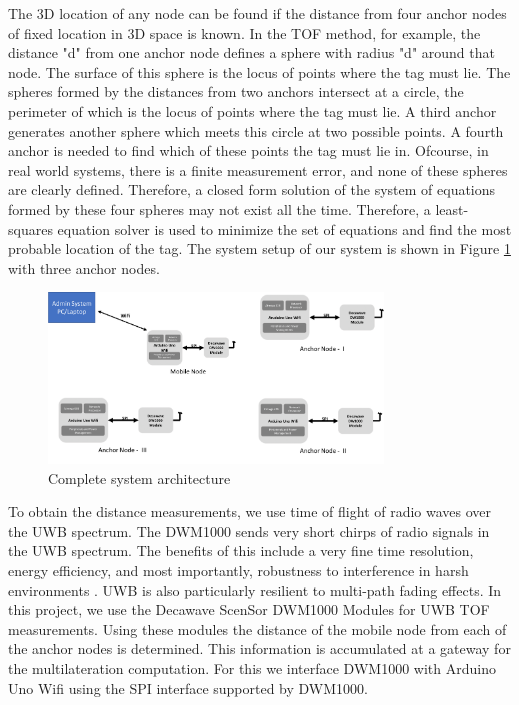 \documentclass[journal,transmag]{IEEEtran}
\begin{document}
The 3D location of any node can be found if the distance from four anchor nodes of fixed location in 3D space is known.  In the TOF method, for example, the distance "d" from one anchor node defines a sphere with radius "d" around that node.  The surface of this sphere is the locus of points where the tag must lie.  The spheres formed by the distances from two anchors intersect at a circle, the perimeter of which is the locus of points where the tag must lie.  A third anchor generates another sphere which meets this circle at two possible points.  A fourth anchor is needed to find which of these points the tag must lie in.  Ofcourse, in real world systems, there is a finite measurement error, and none of these spheres are clearly defined.  Therefore, a closed form solution of the system of equations formed by these four spheres may not exist all the time.  Therefore, a least-squares equation solver is used to minimize the set of equations and find the most probable location of the tag. The system setup of our system is shown in Figure \ref{SYSTEMBD} with three anchor nodes.\\
\begin{figure}[!h]
\centering
\includegraphics[width=3.5in]{sysbd.png}
\caption{{Complete system architecture}}
\label{SYSTEMBD}
\end{figure}
To obtain the distance measurements, we use time of flight of radio waves over the UWB spectrum. The DWM1000 sends very short chirps of radio signals in the UWB spectrum. The benefits of this include a very fine time resolution, energy efficiency, and most importantly, robustness to interference in harsh environments \cite{uwb}. UWB is also particularly resilient to multi-path fading effects.  In this project, we use the Decawave ScenSor DWM1000 Modules for UWB TOF measurements. Using these modules the distance of the mobile node from each of the anchor nodes is determined. This information is accumulated at a gateway for the multilateration computation. For this we interface DWM1000 with Arduino Uno Wifi using the SPI interface supported by DWM1000. 
\end{document}
